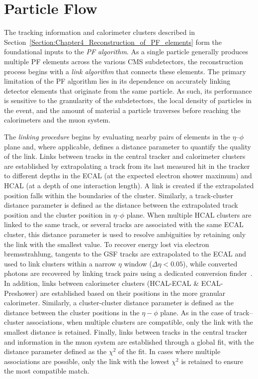 \section{Particle Flow}
The tracking information and calorimeter clusters described in Section~\ref{Section:Chapter4_Reconstruction_of_PF_elements} form the foundational inputs to the \textit{\ac{PF} algorithm}. As a single particle generally produces multiple \ac{PF} elements across the various \ac{CMS} subdetectors, the reconstruction process begins with a \textit{link algorithm} that connects these elements. The primary limitation of the \ac{PF} algorithm lies in its dependence on accurately linking detector elements that originate from the same particle. As such, its performance is sensitive to the granularity of the subdetectors, the local density of particles in the event, and the amount of material a particle traverses before reaching the calorimeters and the muon system.

The \textit{linking procedure} begins by evaluating nearby pairs of elements in the $\eta$–$\phi$ plane and, where applicable, defines a distance parameter to quantify the quality of the link. Links between tracks in the central tracker and calorimeter clusters are established by extrapolating a track from its last measured hit in the tracker to different depths in the \ac{ECAL} (at the expected electron shower maximum) and \ac{HCAL} (at a depth of one interaction length). A link is created if the extrapolated position falls within the boundaries of the cluster. Similarly, a track-cluster distance parameter is defined as the distance between the extrapolated track position and the cluster position in $\eta$–$\phi$ plane. When multiple \ac{HCAL} clusters are linked to the same track, or several tracks are associated with the same \ac{ECAL} cluster, this distance parameter is used to resolve ambiguities by retaining only the link with the smallest value. To recover energy lost via electron bremsstrahlung, tangents to the \ac{GSF} tracks are extrapolated to the \ac{ECAL} and used to link clusters within a narrow $\eta$ window ($\Delta\eta < 0.05$), while converted photons are recovered by linking track pairs using a dedicated conversion finder~\cite{DedicatedConversionFinder}. In addition, links between calorimeter clusters (\ac{HCAL}-\ac{ECAL} \& \ac{ECAL}-Preshower) are established based on their positions in the more granular calorimeter. Similarly, a cluster-cluster distance parameter is defined as the distance between the cluster positions in the $\eta-\phi$ plane. As in the case of track–cluster associations, when multiple clusters are compatible, only the link with the smallest distance is retained. Finally, links between tracks in the central tracker and information in the muon system are established through a global fit, with the distance parameter defined as the $\chi^2$ of the fit. In cases where multiple associations are possible, only the link with the lowest $\chi^2$ is retained to ensure the most compatible match.

